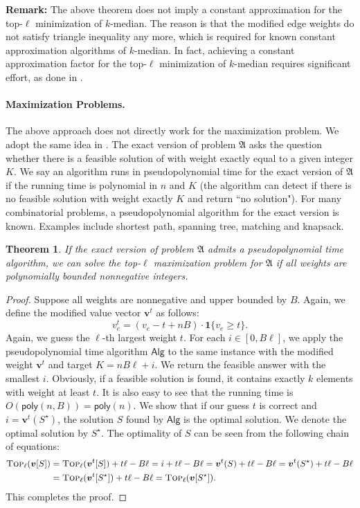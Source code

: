 \documentclass[11pt,a4paper]{article} \usepackage{enumitem}
\newcommand{\boldv}{\boldsymbol{v}}
\newcommand{\myproblem}{\mathfrak{A}}
\newcommand{\Algo}{\mathsf{Alg}}
\newcommand{\topp}[1]{\textsc{Top}_{#1}}
\newcommand{\poly}{\mathsf{poly}}
\newtheorem{theorem}{Theorem}[section]
\theoremstyle{definition}
\begin{document}
\noindent
{\bf Remark:}
The above theorem does not imply a constant approximation for the top-$\ell$ minimization of $k$-median. 
The reason is that the modified edge weights do not satisfy triangle inequality
any more, which is required for known constant approximation algorithms of $k$-median.
In fact, achieving a constant approximation factor for the top-$\ell$ minimization of $k$-median requires significant effort, as done in \cite{chakrabarty2018interpolating,byrka2018constant,chakrabarty2019approximation}.

\paragraph{Maximization Problems.}

The above approach does not directly work for the maximization problem.
We adopt the same idea in \cite{maalouly2022exact}.
The exact version of problem $\myproblem$ asks the question whether there is a feasible solution of with weight exactly equal to a given integer $K$. We say an algorithm runs in pseudopolynomial time for
the exact version of $\myproblem$ if the running time is 
polynomial in $n$ and $K$ (the algorithm can detect if there is no feasible solution with weight exactly $K$ and return ``no solution"). For many combinatorial problems, 
a pseudopolynomial algorithm for the exact version is known. Examples include shortest path, spanning tree, matching and knapsack.

\begin{theorem}
If the exact version of problem $\myproblem$ admits a pseudopolynomial time
algorithm, we can solve the top-$\ell$ {\em maximization} problem for 
$\myproblem$ if all weights are polynomially bounded nonnegative integers.
\end{theorem}
\begin{proof}
Suppose all weights are nonnegative and upper bounded by $B$.
Again, we define the modified value vector $\boldv^t$ as follows:
$$
v^t_e = (v_e-t+nB)\cdot \mathbf{1}\{v_e\geq t\}.
$$
Again, we guess the $\ell$-th largest weight $t$.
For each $i\in [0,B\ell]$,
we apply the pseudopolynomial time algorithm $\Algo$ to the same instance with the modified weight $\boldv^t$ and target $K=nB\ell+i$.
We return the feasible answer with the smallest $i$.
Obviously, if a feasible solution is found, it contains exactly $k$
elements with weight at least $t$.
It is also easy to see that the running time is $O(\poly(n, B))= \poly(n)$.
We show that if our guess $t$ is correct and 
$i=\boldv^t(S^\star)$, the solution $S$ found by $\Algo$
is the optimal solution.
We denote the optimal solution by $S^\star$.
The optimality of $S$ can be seen from the following chain of equations:
\begin{align*}
\topp{\ell}(\boldv[S]) & = \topp{\ell}(\boldv^t[S]) + t\ell -B\ell
= i +t\ell - B\ell
= \boldv^t(S) +t\ell - B\ell
= \boldv^t(S^\star) +t\ell - B\ell \\
& =\topp{\ell}(\boldv^t[S^\star])+t\ell - B\ell
  =\topp{\ell}(\boldv[S^\star]).
\end{align*}
This completes the proof.
\end{proof}
\end{document}
